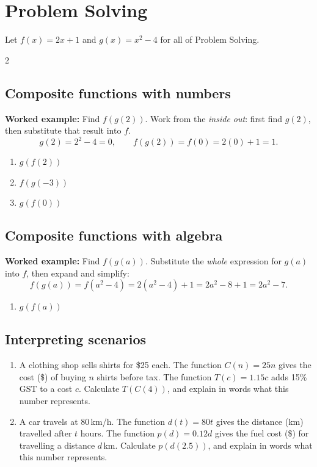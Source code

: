 \documentclass[11pt]{article}
\newcommand{\ans}{\hrulefill}
\newcommand{\anshere}{\par\vspace{0.3em}\noindent\ans\par\vspace{0.3em}}
\begin{document}
\newpage

\section*{Problem Solving}

\begingroup\small
\noindent Let $f(x) = 2x+1$ and $g(x) = x^2-4$ for all of Problem Solving.

\begin{multicols}{2}
\subsection*{Composite functions with numbers}
\noindent\textbf{Worked example:} Find $f(g(2))$. Work from the \emph{inside out}: first find
$g(2)$, then substitute that result into $f$.
\[
  g(2) = 2^2-4 = 0, \qquad f(g(2)) = f(0) = 2(0)+1 = 1.
\]
\vspace{0.2em}
\begin{enumerate}[label=(\alph*)]
  \item $g(f(2))$
  \anshere
  \item $f(g(-3))$
  \anshere
  \item $g(f(0))$
  \anshere
\end{enumerate}

\columnbreak

\subsection*{Composite functions with algebra}
\noindent\textbf{Worked example:} Find $f(g(a))$. Substitute the \emph{whole} expression for
$g(a)$ into $f$, then expand and simplify:
\[
  f(g(a)) = f(a^2-4) = 2(a^2-4)+1 = 2a^2-8+1=2a^2-7.
\]
\vspace{0.2em}
\begin{enumerate}[label=(\alph*)]
  \item $g(f(a))$
  \anshere
\end{enumerate}

\vspace{0.6em}
\subsection*{Interpreting scenarios}
\begin{enumerate}[label=(\alph*)]
  \item A clothing shop sells shirts for \$25 each. The function $C(n)=25n$ gives the cost (\$)
    of buying $n$ shirts before tax. The function $T(c)=1.15c$ adds 15\% GST to a cost $c$.
    Calculate $T(C(4))$, and explain in words what this number represents.
  \anshere
  \item A car travels at $80$\,km/h. The function $d(t)=80t$ gives the distance (km) travelled
    after $t$ hours. The function $p(d)=0.12d$ gives the fuel cost (\$) for travelling a distance
    $d$\,km. Calculate $p(d(2.5))$, and explain in words what this number represents.
  \anshere
\end{enumerate}
\end{multicols}
\endgroup
\end{document}
